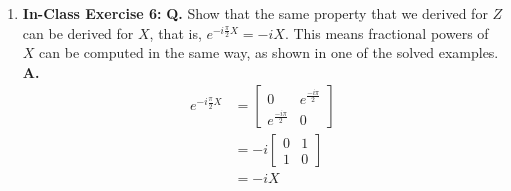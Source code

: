 \documentclass[main.tex]{subfiles}
\begin{document}
\begin{enumerate}
\item[] \textbf{In-Class Exercise 6:} \textbf{Q.} Show that the same property that we derived for $Z$ can be derived for $X$, that is, $e^{-i \frac{\pi}{2} X}=-i X$. This means fractional powers of $X$ can be computed in the same way, as shown in one of the solved examples. \textbf{A.}
    \begin{align*}
        e^{-i \frac{\pi}{2} X}  & = \left[\begin{array}{ll}0&e^{\frac{-i\pi}{2}}\\
                                e^{\frac{-i\pi}{2}}&0\end{array}\right]\\
                                & = -i \left[\begin{array}{ll}0 & 1 \\1 & 0\end{array}\right]\\
                                & = -i X
    \end{align*}


\end{enumerate}
\end{document}
